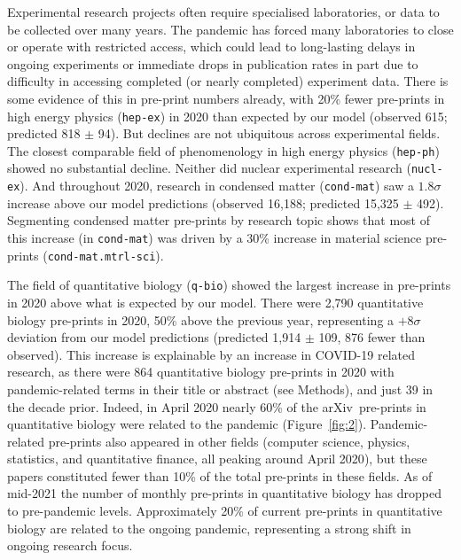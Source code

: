 \documentclass[]{rsos}%
\newcommand{\arxiv}{arXiv}
\begin{document}
Experimental research projects often require specialised laboratories, or data to be collected over many years. The pandemic has forced many laboratories to close or operate with restricted access\cite{PhysicsWorld,ScienceMag,Castelvecchi}, which could lead to long-lasting delays in ongoing experiments or immediate drops in publication rates in part due to difficulty in accessing completed (or nearly completed) experiment data. There is some evidence of this in pre-print numbers already, with {20\%} fewer pre-prints in high energy physics (\texttt{hep-ex}) in 2020 than expected by our model (observed 615; predicted 818 $\pm$ 94). But declines are not ubiquitous across experimental fields. The closest comparable field of phenomenology in high energy physics (\texttt{hep-ph}) showed no substantial decline. Neither did nuclear experimental research (\texttt{nucl-ex}). And throughout 2020, research in condensed matter (\texttt{cond-mat}) saw a $1.8\sigma$ increase above our model predictions (observed 16,188; predicted 15,325 $\pm$ 492). 
Segmenting condensed matter pre-prints by research topic shows that most of this increase (in \texttt{cond-mat}) was driven by a 30\% increase in material science pre-prints (\texttt{cond-mat.mtrl-sci}).


The field of quantitative biology (\texttt{q-bio}) showed the largest increase in pre-prints in 2020 above what is expected by our model. There were {2,790} quantitative biology pre-prints in 2020, {50\%} above the previous year, representing a $+8\sigma$ deviation from our model predictions (predicted 1,914 $\pm$ 109, 876 fewer than observed). This increase is explainable by an increase in COVID-19 related research, as there were 864 quantitative biology pre-prints in 2020 with pandemic-related terms in their title or abstract (see Methods), and just 39 in the decade prior. Indeed, in {April 2020} nearly 60\% of the \arxiv\ pre-prints in quantitative biology were related to the pandemic (Figure~\ref{fig:2}). Pandemic-related pre-prints also appeared in other fields (computer science, physics, statistics, and quantitative finance, all peaking around {April 2020}), but these papers constituted fewer than 10\% of the total pre-prints in these fields. As of mid-2021 the number of monthly pre-prints in quantitative biology has dropped to pre-pandemic levels. Approximately 20\% of current pre-prints in quantitative biology are related to the ongoing pandemic, representing a strong shift in ongoing research focus.
\end{document}
